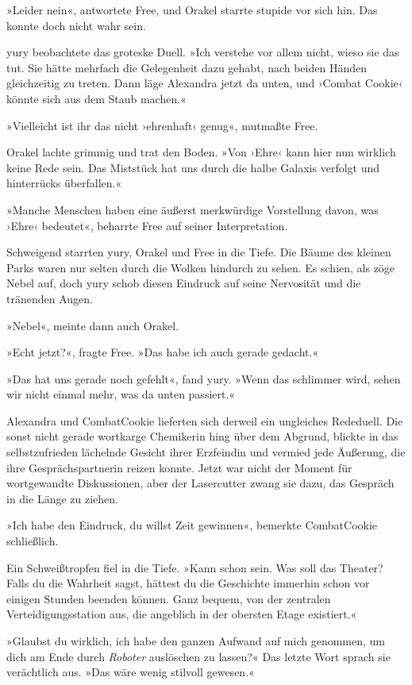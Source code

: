 »Leider nein«, antwortete Free, und Orakel starrte stupide vor sich hin. Das konnte doch nicht wahr sein.

yury beobachtete das groteske Duell. »Ich verstehe vor allem nicht, wieso sie das tut. Sie hätte mehrfach die Gelegenheit dazu gehabt, nach beiden Händen gleichzeitig zu treten. Dann läge Alexandra jetzt da unten, und ›Combat Cookie‹ könnte sich aus dem Staub machen.«

»Vielleicht ist ihr das nicht ›ehrenhaft‹ genug«, mutmaßte Free.

Orakel lachte grimmig und trat den Boden. »Von ›Ehre‹ kann hier nun wirklich keine Rede sein. Das Miststück hat uns durch die halbe Galaxis verfolgt und hinterrücks überfallen.«

»Manche Menschen haben eine äußerst merkwürdige Vorstellung davon, was ›Ehre‹ bedeutet«, beharrte Free auf seiner Interpretation.

Schweigend starrten yury, Orakel und Free in die Tiefe. Die Bäume des kleinen Parks waren nur selten durch die Wolken hindurch zu sehen. Es schien, als zöge Nebel auf, doch yury schob diesen Eindruck auf seine Nervosität und die tränenden Augen.

»Nebel«, meinte dann auch Orakel.

»Echt jetzt?«, fragte Free. »Das habe ich auch gerade gedacht.«

»Das hat uns gerade noch gefehlt«, fand yury. »Wenn das schlimmer wird, sehen wir nicht einmal mehr, was da unten passiert.«

Alexandra und CombatCookie lieferten sich derweil ein ungleiches Rededuell. Die sonst nicht gerade wortkarge Chemikerin hing über dem Abgrund, blickte in das selbstzufrieden lächelnde Gesicht ihrer Erzfeindin und vermied jede Äußerung, die ihre Gesprächspartnerin reizen konnte. Jetzt war nicht der Moment für wortgewandte Diskussionen, aber der Lasercutter zwang sie dazu, das Gespräch in die Länge zu ziehen.

»Ich habe den Eindruck, du willst Zeit gewinnen«, bemerkte CombatCookie schließlich.

Ein Schweißtropfen fiel in die Tiefe. »Kann schon sein. Was soll das Theater? Falls du die Wahrheit sagst, hättest du die Geschichte immerhin schon vor einigen Stunden beenden können. Ganz bequem, von der zentralen Verteidigungsstation aus, die angeblich in der obersten Etage existiert.«

»Glaubst du wirklich, ich habe den ganzen Aufwand auf mich genommen, um dich am Ende durch \textit{Roboter} auslöschen zu lassen?« Das letzte Wort sprach sie verächtlich aus. »Das wäre wenig stilvoll gewesen.«

